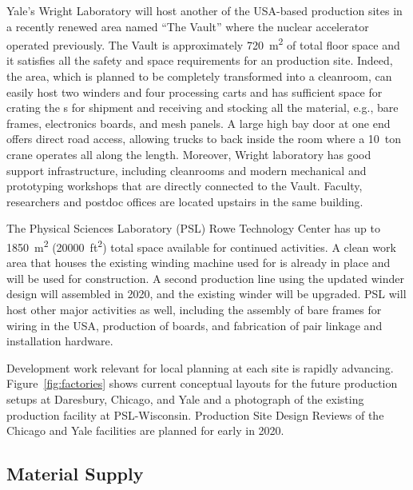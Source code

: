Yale's Wright Laboratory will host another of the USA-based  production sites in a recently renewed area named ``The Vault'' where the nuclear accelerator operated previously.  The Vault is approximately \SI{720}{m^2} of total floor space and it satisfies all the safety and space requirements for an  production site. 
Indeed, the area, which is planned to be completely transformed into a cleanroom, can easily host two winders and four processing carts and has sufficient space for crating the 
s for shipment and receiving and stocking all the material, e.g., bare frames, electronics boards, and mesh panels. A large high bay door at one end offers direct road access, allowing trucks to back inside the room where a \SI{10}{ton} crane operates all along the length.  Moreover, Wright laboratory has good support infrastructure, including cleanrooms and modern mechanical and prototyping workshops that are directly connected to the Vault. Faculty, researchers and postdoc offices are located upstairs in the same building. %

The Physical Sciences Laboratory (PSL) Rowe Technology Center has up to \SI{1850}{m^2} (\SI{20000}{ft^2}) total space available for continued  activities.  A clean work area that houses the existing winding machine used for  is already in place and will be used for   construction. A second  production line using the updated winder design will assembled in 2020, and the existing winder will be upgraded.  PSL will host other major activities as well, including the assembly of bare  frames for wiring in the USA, production of  boards, and fabrication of  pair linkage and installation hardware.

Development work relevant for local planning at each site is rapidly advancing.  Figure~\ref{fig:factories} shows current conceptual layouts for the future production setups at Daresbury, Chicago, and Yale and a photograph of the existing  production facility at PSL-Wisconsin.  Production Site Design Reviews of the Chicago and Yale facilities are planned for early in 2020. 

\subsection{Material Supply}  
\label{sec:fdsp-apa-prod-supply}

